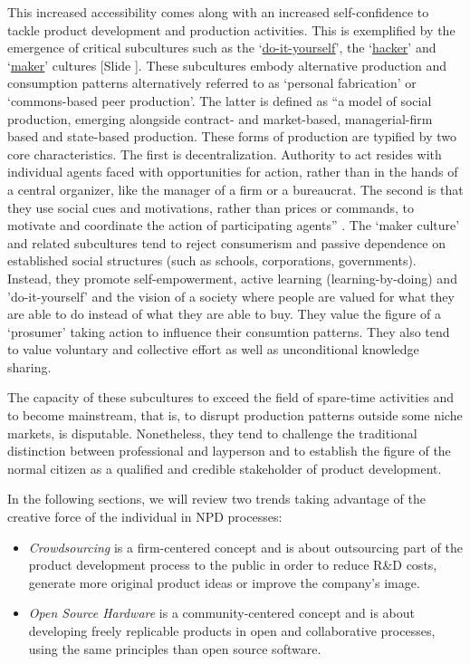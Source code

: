 \documentclass{article}
\newcounter{slide}
\begin{document}
This increased accessibility comes along with an increased self-confidence to tackle product development and production activities. This is exemplified by the emergence of critical subcultures such as the `\href{https://en.wikipedia.org/wiki/DIY_ethic}{do-it-yourself}', the `\href{https://en.wikipedia.org/wiki/Hacker_culture}{hacker}' and `\href{https://en.wikipedia.org/wiki/Maker_culture}{maker}' cultures {\color{blue}[Slide ]}. These subcultures embody alternative production and consumption patterns alternatively referred to as `personal fabrication' \cite{gershenfeldFabComingRevolution2007} or `commons-based peer production'. The latter is defined as ``a model of social production, emerging alongside contract- and market-based, managerial-firm based and state-based production. These forms of production are typified by two core characteristics. The first is decentralization. Authority to act resides with individual agents faced with opportunities for action, rather than in the hands of a central organizer, like the manager of a firm or a bureaucrat. The second is that they use social cues and motivations, rather than prices or commands, to motivate and coordinate the action of participating agents'' \cite{benklerCommonsbasedPeerProduction2006}. The `maker culture' and related subcultures tend to reject consumerism and passive dependence on established social structures (such as schools, corporations, governments). Instead, they promote self-empowerment, active learning (learning-by-doing) and 'do-it-yourself' and the vision of a society where people are valued for what they are able to do instead of what they are able to buy. They value the figure of a `prosumer' taking action to influence their consumtion patterns. They also tend to value voluntary and collective effort as well as unconditional knowledge sharing.

The capacity of these subcultures to exceed the field of spare-time activities and to become mainstream, that is, to disrupt production patterns outside some niche markets, is disputable. Nonetheless, they tend to challenge the traditional distinction between professional and layperson and to establish the figure of the normal citizen as a qualified and credible stakeholder of product development.

In the following sections, we will review two trends taking advantage of the creative force of the individual in NPD processes:
\begin{itemize}
	\item \emph{Crowdsourcing} is a firm-centered concept and is about outsourcing part of the product development process to the public in order to reduce R\&D costs, generate more original product ideas or improve the company's image. 
	\item \emph{Open Source Hardware} is a community-centered concept and is about developing freely replicable products in open and collaborative processes, using the same principles than open source software. 
\end{itemize}
\end{document}
